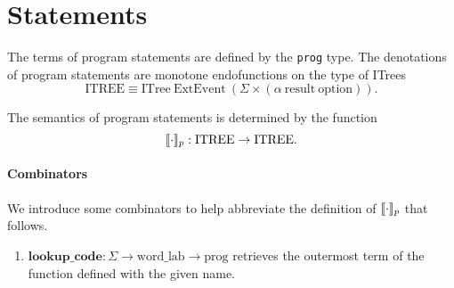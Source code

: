 \documentclass{article}
\begin{document}
\section{Statements}
\label{sec:statements}

The terms of program statements are defined by the \texttt{prog} type. The denotations of program statements are monotone endofunctions on the type of ITrees
\begin{equation*}
  \text{ITREE} \equiv \text{ITree}\ \text{ExtEvent}\ (\Sigma \times (\alpha\ \text{result}\ \text{option})).
\end{equation*}

The semantics of program statements is determined by the function
\begin{equation}
  \label{eq:2}
  \llbracket \cdot \rrbracket_{p} : \text{ITREE} \to \text{ITREE}.
\end{equation}

\paragraph{Combinators}

We introduce some combinators to help abbreviate the definition of $\llbracket \cdot \rrbracket_{p}$ that follows.
\newcommand{\innertyp}{\Sigma \times (\alpha\ \text{result}\ \text{option})}

\begin{enumerate}
  \item $\textbf{lookup\_code} : \Sigma \to \text{word\_lab} \to \text{prog}$ retrieves the outermost term of the function defined with the given name.
\end{enumerate}
\end{document}
